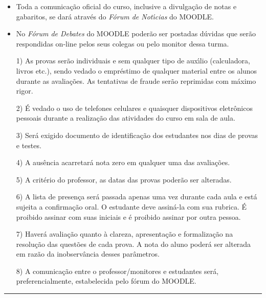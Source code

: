 \documentclass[12pt]{article}
\begin{document}
\begin{itemize}
\item Toda a comunica\c{c}\~{a}o oficial do curso, inclusive a divulga\c{c}\~{a}o de
notas e gabaritos, se dar\'{a} atrav\'{e}s do {\em F\'{o}rum de Not\'{\i}cias} do
MOODLE.\vspace{-0.20cm}
\item No {\em F\'{o}rum de Debates} do MOODLE poder\~{a}o ser
postadas d\'{u}vidas que ser\~{a}o respondidas on-line pelos seus
colegas ou pelo monitor dessa turma.
\end{itemize}


\begin{itemize}
\item[1)] As provas ser\~{a}o individuais e sem qualquer tipo de
aux\'{\i}lio (calculadora, livros etc.), sendo vedado o empr\'{e}stimo de
qualquer material entre os alunos durante as avalia\c{c}\~{o}es. As
tentativas de fraude ser\~{a}o reprimidas com m\'{a}ximo rigor.

\item[2)] \'{E} vedado o uso de telefones celulares e quaisquer dispositivos eletr\^{o}nicos pessoais durante a realiza\c{c}\~{a}o das atividades do curso em sala de aula.

\item[3)] Ser\'{a} exigido documento de identifica\c{c}\~{a}o dos estudantes nos
dias de provas e testes.

\item[4)] A aus\^{e}ncia acarretar\'{a} nota zero em qualquer uma das
avalia\c{c}\~{o}es.

\item[5)] A crit\'{e}rio do professor, as datas das provas poder\~{a}o
ser alteradas.

\item[6)] A lista de presen\c{c}a ser\'{a} passada apenas uma vez
durante cada aula e est\'{a} sujeita a confirma\c{c}\~{a}o oral. O
estudante deve assin\'{a}-la com sua rubrica. {\'E} proibido assinar
com suas iniciais e \'{e} proibido assinar por outra pessoa.

\item[7)] Haver{\'a} avalia{\c c}{\~a}o quanto {\`a} clareza, apresenta{\c
c}{\~a}o e formaliza{\c c}{\~a}o na  resolu{\c c}{\~a}o das quest{\~o}es de
cada prova. A nota do aluno poder{\'a} ser alterada em raz{\~a}o da
inobserv{\^a}ncia desses par{\^a}metros.

\item[8)] A comunica\c{c}\~ao entre o professor/monitores e estudantes ser\'a, preferencialmente,
 estabelecida pelo f\'orum do MOODLE.
\end{itemize}

\vfill
\hrule
\end{document}
